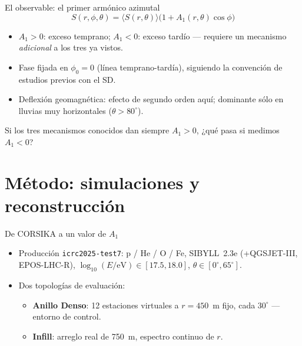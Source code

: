 \documentclass[aspectratio=169,11pt]{beamer}
\begin{document}
\begin{frame}{El observable: el primer armónico azimutal}
  \begin{equation*}
    S(r,\phi,\theta) = \langle S(r,\theta) \rangle \big(1 + A_1(r,\theta)\cos\phi\big)
  \end{equation*}
  \begin{itemize}
    \item $A_1 > 0$: exceso temprano; $A_1 < 0$: exceso tardío --- requiere
      un mecanismo \emph{adicional} a los tres ya vistos.
    \item Fase fijada en $\phi_0=0$ (línea temprano-tardía), siguiendo la
      convención de estudios previos con el SD.
    \item Deflexión geomagnética: efecto de segundo orden aquí; dominante
      sólo en lluvias muy horizontales ($\theta>80^\circ$).
  \end{itemize}
  \vspace{0.2em}
  \centering
  \alert{Si los tres mecanismos conocidos dan siempre $A_1>0$,
  ¿qué pasa si medimos $A_1<0$?}
\end{frame}

\section{Método: simulaciones y reconstrucción}

\begin{frame}{De CORSIKA a un valor de $A_1$}
  \begin{center}
  \end{center}
  \begin{itemize}
    \item Producción \texttt{icrc2025-test7}: p / He / O / Fe, SIBYLL~2.3e (+QGSJET-III,
      EPOS-LHC-R), $\log_{10}(E/\text{eV})\in[17.5,18.0]$, $\theta\in[0^\circ,65^\circ]$.
    \item Dos topologías de evaluación:
    \begin{itemize}
      \item \textbf{Anillo Denso}: 12 estaciones virtuales a $r=450$~m fijo,
        cada $30^\circ$ --- entorno de control.
      \item \textbf{Infill}: arreglo real de 750~m, espectro continuo de $r$.
    \end{itemize}
  \end{itemize}
\end{frame}
\end{document}
